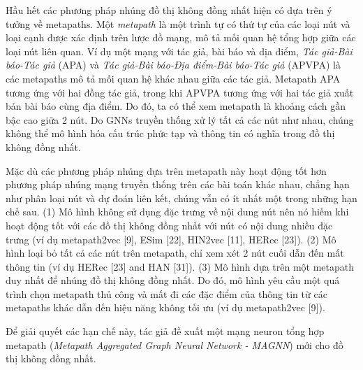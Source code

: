  Hầu hết các phương pháp nhúng đồ thị không đồng nhất hiện có dựa trên ý tưởng về metapaths. Một \textit{metapath} là một trình tự có thứ tự của các loại nút và loại cạnh được xác định trên lược đồ mạng, mô tả mối quan hệ tổng hợp giữa các loại nút liên quan. Ví dụ một mạng với tác giả, bài báo và dịa điểm, \textit{Tác giả-Bài báo-Tác giả} (APA) và \textit{Tác giả-Bài báo-Địa điểm-Bài báo-Tác giả} (APVPA) là các metapaths mô tả mối quan hệ khác nhau giữa các tác giả. Metapath APA tương ứng với hai đồng tác giả, trong khi APVPA tương ứng với hai tác giả xuất bản bài báo cùng địa điểm. Do đó, ta có thể xem metapath là khoảng cách gần bậc cao giữa 2 nút. Do GNNs truyền thống xử lý tất cả các nút như nhau, chúng không thể mô hình hóa cấu trúc phức tạp và thông tin có nghĩa trong đồ thị không đồng nhất.


 Mặc dù các phương pháp nhúng dựa trên metapath này hoạt động tốt hơn phương pháp nhúng mạng truyền thống trên các bài toán khác nhau, chẳng hạn như phân loại nút và dự đoán liên kết, chúng vẫn có ít nhất một trong những hạn chế sau. (1) Mô hình không sử dụng đặc trưng về nội dung nút nên nó hiếm khi hoạt động tốt với các đồ thị không đồng nhất với nút có nội dung nhiều đặc trưng (ví dụ metapath2vec [9], ESim [22], HIN2vec [11], HERec [23]). (2) Mô hình loại bỏ tất cả các nút trên metapath, chỉ xem xét 2 nút cuối dẫn đến mất thông tin (ví dụ HERec [23] and HAN [31]). (3) Mô hình dựa trên một metapath duy nhất để nhúng đồ thị không đồng nhất. Do đó, mô hình yêu cầu một quá trình chọn metapath thủ công và mất đi các đặc điểm của thông tin từ các metapaths khác dẫn đến hiệu năng không tối ưu (ví dụ metapath2vec [9]). 

 Để giải quyết các hạn chế này, tác giả đề xuất một mạng neuron tổng hợp metapath (\textit{Metapath Aggregated Graph Neural Network - MAGNN}) mới cho đồ thị không đồng nhất. 
